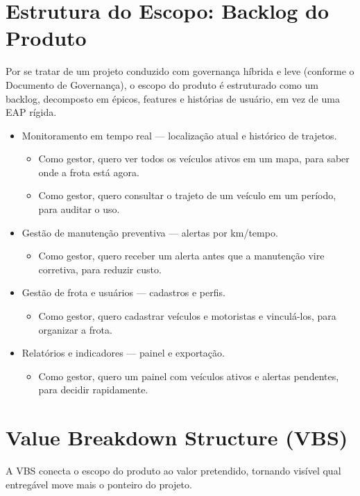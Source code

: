\documentclass[11pt,a4paper]{article}
\begin{document}
\section{Estrutura do Escopo: Backlog do Produto}
Por se tratar de um projeto conduzido com governança híbrida e leve (conforme o Documento de Governança), o escopo do produto é estruturado como um backlog, decomposto em épicos, features e histórias de usuário, em vez de uma EAP rígida.

\begin{itemize}[itemsep=4pt]
  \item[\textbf{E1}] Monitoramento em tempo real --- localização atual e histórico de trajetos.
  \begin{itemize}
    \item Como gestor, quero ver todos os veículos ativos em um mapa, para saber onde a frota está agora.
    \item Como gestor, quero consultar o trajeto de um veículo em um período, para auditar o uso.
  \end{itemize}
  \item[\textbf{E2}] Gestão de manutenção preventiva --- alertas por km/tempo.
  \begin{itemize}
    \item Como gestor, quero receber um alerta antes que a manutenção vire corretiva, para reduzir custo.
  \end{itemize}
  \item[\textbf{E3}] Gestão de frota e usuários --- cadastros e perfis.
  \begin{itemize}
    \item Como gestor, quero cadastrar veículos e motoristas e vinculá-los, para organizar a frota.
  \end{itemize}
  \item[\textbf{E4}] Relatórios e indicadores --- painel e exportação.
  \begin{itemize}
    \item Como gestor, quero um painel com veículos ativos e alertas pendentes, para decidir rapidamente.
  \end{itemize}
\end{itemize}

\section{Value Breakdown Structure (VBS)}
A VBS conecta o escopo do produto ao valor pretendido, tornando visível qual entregável move mais o ponteiro do projeto.
\end{document}

